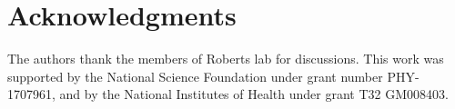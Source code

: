 \section*{Acknowledgments}
The authors thank the members of Roberts lab for discussions. This work was supported by the National Science Foundation under grant number PHY-1707961, and by the National Institutes of Health under grant T32 GM008403.

\newpage
\begin{subappendices}



%





%

\newpage
\normalsize





\newpage
{}



\end{subappendices}
%
